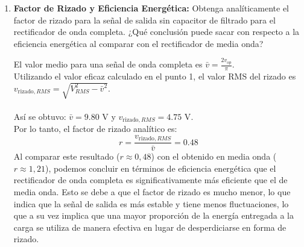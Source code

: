\begin{enumerate}
    \item \textbf{Factor de Rizado y Eficiencia Energética:}
    Obtenga analíticamente el factor de rizado para la señal de salida sin capacitor de filtrado para el rectificador de onda completa. ¿Qué conclusión puede sacar con respecto a la eficiencia energética al comparar con el rectificador de media onda?
    
    \begin{tcolorbox}[colback=white, colframe=gray!50, title=Respuesta]
        El valor medio para una señal de onda completa es $\bar{v} = \frac{2v_{op}}{\pi}$. \\
        Utilizando el valor eficaz calculado en el punto 1, el valor RMS del rizado es $v_{\text{rizado}, RMS} = \sqrt{V_{RMS}^2 - \bar{v}^2}$. \\
        \\
        Así se obtuvo: $\bar{v} = \text{9.80 V}$ y $v_{\text{rizado}, RMS} = \text{4.75 V}$. \\
        
        Por lo tanto, el factor de rizado analítico es:
        \[ r = \frac{v_{\text{rizado}, RMS}}{\bar{v}} = 0.48 \]
        Al comparar este resultado ($r \approx 0,48$) con el obtenido en media onda ($r \approx 1,21$), podemos concluir en términos de eficiencia energética que el rectificador de onda completa es significativamente más eficiente que el de media onda. Esto se debe a que el factor de rizado es mucho menor, lo que indica que la señal de salida es más estable y tiene menos fluctuaciones, lo que a su vez implica que una mayor proporción de la energía entregada a la carga se utiliza de manera efectiva en lugar de desperdiciarse en forma de rizado.
    \end{tcolorbox}
\end{enumerate}